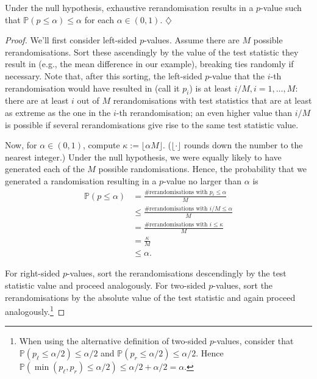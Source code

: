 \documentclass[a4paper]{tufte-book}\usepackage[]{graphicx}\usepackage[]{xcolor}
\newcommand*{\parend}[1][$\diamondsuit$]{%
\leavevmode\unskip\penalty9999 \hbox{}\nobreak\hfill
    \quad\hbox{#1}%
}
\begin{document}
\label{lemma:boundpval}
  Under the null hypothesis, exhaustive rerandomisation results in a $p$-value
  such that $\mathbb{P}(p \leq \alpha) \leq \alpha$ for each $\alpha \in (0, 1)$.
\parend

\begin{proof}
  We'll first consider left-sided $p$-values.
  Assume there are $M$ possible rerandomisations.
  Sort these ascendingly by the value of the test statistic
  they result in (e.g., the mean difference in our example), 
  breaking ties randomly if necessary.
  Note that, after this sorting, 
  the left-sided $p$-value that the $i$-th rerandomisation would have 
  resulted in (call it $p_i$) is at least $i/M, i = 1, \dots, M$: there are at least $i$ out of $M$
  rerandomisations with test statistics that are at least as extreme
  as the one in the $i$-th rerandomisation;
  an even higher value than $i/M$ is possible if several rerandomisations
  give rise to the same test statistic value.
  
  Now, for $\alpha \in (0, 1)$, compute $\kappa := \lfloor \alpha M \rfloor$.
  ($\lfloor \cdot \rfloor$ rounds down the number to the nearest integer.)
  Under the null hypothesis, we were equally likely to have generated
  each of the $M$ possible randomisations.
  Hence, the probability that we generated a randomisation resulting
  in a $p$-value no larger than $\alpha$ is
  \begin{align*}
    \mathbb{P}(p \leq \alpha)
    &= \frac{\textrm{\# rerandomisations with $p_i \leq \alpha$}}{M}\\
    &\leq \frac{\textrm{\# rerandomisations with $i/M \leq \alpha$}}{M}\\
    &= \frac{\textrm{\# rerandomisations with $i \leq \kappa$}}{M} \\
    &= \frac{\kappa}{M} \\
    &\leq \alpha.
  \end{align*}
  
  For right-sided $p$-values, sort the rerandomisations descendingly by
  the test statistic value and proceed analogously.
  For two-sided $p$-values, sort the rerandomisations by the
  absolute value of the test statistic and again proceed analogously.\footnote{When
  using the alternative definition of two-sided $p$-values,
  consider that $\mathbb{P}(p_{\ell} \leq \alpha/2) \leq \alpha/2$
  and $\mathbb{P}(p_r \leq \alpha/2) \leq \alpha/2$.
  Hence $\mathbb{P}(\min(p_{\ell}, p_r) \leq \alpha/2) \leq \alpha/2 + \alpha/2 = \alpha$.}
\end{proof}
\end{document}
